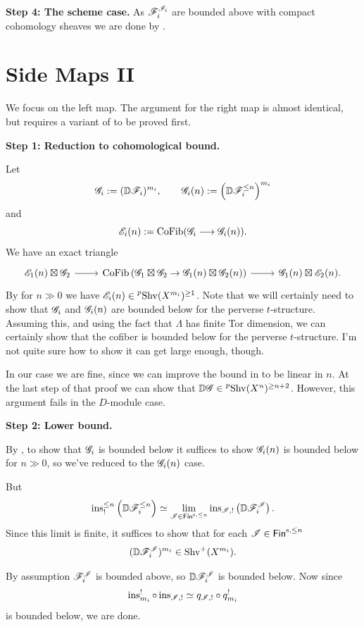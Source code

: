 \documentclass[oneside]{amsart}
\newcommand{\pShv}{\prescript{p}{}{\Shv}}
\begin{document}
\textbf{Step 4: The scheme case.}
As $\mathscr{F}_i^{\mathscr{I}_i}$ are bounded above with compact cohomology sheaves we are done by \cite[Lemma~7.3.2]{abott}.

\section{Side Maps II}
We focus on the left map. The argument for the right map is almost identical, but requires a variant of  to be proved first.

\textbf{Step 1: Reduction to cohomological bound.}

Let
\[
\mathscr{G}_i := (\mathbb{D}\mathscr{F}_i)^{m_i},\qquad \mathscr{G}_i(n) := \left( \mathbb{D}\mathscr{F}_i^{\le n} \right) ^{m_i}
\] 
and
\[
\CE_i(n) \defeq \CoFib(\CG_i \to \CG_i(n)).
\] 
We have an exact triangle
\[
\begin{tikzcd}
	\CE_1(n) \boxtimes \CG_2 \ar[r] & \CoFib\left( \CG_1\boxtimes\CG_2 \to \CG_1(n)\boxtimes\CG_2(n) \right) \ar[r] & \CG_1(n) \boxtimes \CE_2(n).
\end{tikzcd}
\] 
By  for $n\gg 0$ we have $\CE_i(n)\in \pShv(X^{m_i})^{\ge 1}$. Note that we will certainly need to show that $\mathscr{G}_i$ and $\mathscr{G}_i(n)$ are bounded below for the perverse $t$-structure. Assuming this, and using the fact that $\Lambda$ has finite Tor dimension, we can certainly show that the cofiber is bounded below for the perverse $t$-structure. I'm not quite sure how to show it can get large enough, though.

\begin{remark}
	In our case we are fine, since we can improve the bound in  to be linear in $n$. At the last step of that proof we can show that $\VD\CG\in \pShv(X^{n})^{\ge n+2}$. However, this argument fails in the $D$-module case.
\end{remark}

\textbf{Step 2: Lower bound.}

By , to show that $\mathscr{G}_i$ is bounded below it suffices to show $\mathscr{G}_i(n)$ is bounded below for $n\gg 0$, so we've reduced to the $\mathscr{G}_i(n)$ case.

But
\[
	\ins^{\le n}_!\left( \VD\CF_i^{\le n} \right) \isoto \lim_{\CI\in \Fins[n]} \ins_{\CI,!}\left( \VD\CF_i^{\CI} \right) .
\] 
Since this limit is finite, it suffices to show that for each $\CI\in \Fins[n]$ 
\[
	(\mathbb{D}\mathscr{F}_i^{\mathscr{I}})^{m_i} \in \operatorname{Shv}^{+}(X^{m_i}).
\] 

By assumption $\mathscr{F}_i^{\mathscr{I}}$ is bounded above, so $\mathbb{D}\mathscr{F}_i^{\mathscr{I}}$ is bounded below. Now since
\[
\operatorname{ins}_{m_i}^{!}\circ \operatorname{ins}_{\mathscr{I},!} \simeq q_{\mathscr{I},!}\circ q_{m_i}^{!}
\] 
is bounded below, we are done.

\printbibliography
\end{document}
